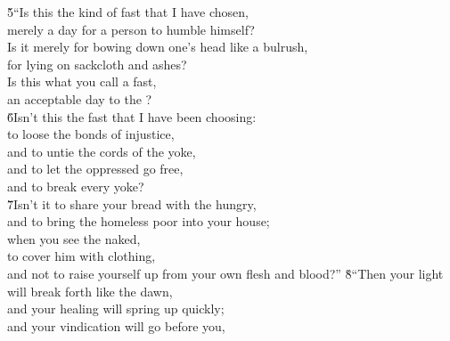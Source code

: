 \begin{poetry}
\poeml \v{5}``Is this the kind of fast that I have chosen, \\
\poemll    merely a day for a person to humble himself? \\
\poeml Is it merely for bowing down one's head like a bulrush, \\
\poemll    for lying on sackcloth and ashes? \\
\poeml Is this what you call a fast, \\
\poemll    an acceptable day to the ? \\
\poeml \v{6}Isn't this the fast that I have been choosing: \\
\poemll    to loose the bonds of injustice, \\
\poeml and to untie the cords of the yoke, \\
\poemll    and to let the oppressed go free, \\
\poemlll       and to break every yoke? \\
\poeml \v{7}Isn't it to share your bread with the hungry, \\
\poemll    and to bring the homeless poor into your house; \\
\poeml when you see the naked, \\
\poemll    to cover him with clothing, \\
\poemlll       and not to raise yourself up from your own flesh and blood?''
\poeml \v{8}``Then your light will break forth like the dawn, \\
\poemll    and your healing will spring up quickly; \\
\poeml and your vindication will go before you, \\

\end{poetry}
